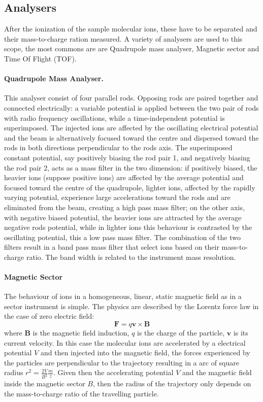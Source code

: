 \subsection{Analysers}

After the ionization of the sample molecular ions, these have to be separated
and their mass-to-charge ration measured.
A variety of analysers are used to this scope, the most commons are are
Quadrupole mass analyser, Magnetic sector and Time Of Flight (TOF).

\paragraph{Quadrupole Mass Analyser.}
This analyser consist of four parallel rods. Opposing rods are paired together
and connected electrically: a variable potential is applied between
the two pair of rods with radio frequency oscillations, while a time-independent
potential is superimposed.
The injected ions are affected by the oscillating electrical potential and the
beam is alternatively focused toward the centre and dispersed toward the rods in
both directions perpendicular to the rods axis.
The superimposed constant potential, say positively biasing the rod pair 1, and
negatively biasing the rod pair 2, acts as a mass filter in the two dimension:
if positively biased, the heavier ions (suppose positive ions) are affected by
the average potential and focused toward the centre of the quadrupole, lighter
ions, affected by the rapidly varying potential, experience large accelerations
toward the rods and are eliminated from the beam, creating a high pass mass
filter;
on the other axis, with negative biased potential, the heavier ions are
attracted by the average negative rods potential, while in lighter ions this
behaviour is contrasted by the oscillating potential, this a low pass mass
filter.
The combination of the two filters result in a band pass mass filter that select
ions based on their mass-to-charge ratio. The band width is related to the
instrument mass resolution\cite{Miller1986}.


\paragraph{Magnetic Sector}
The behaviour of ions in a homogeneous, linear, static magnetic field
as in a sector instrument is simple. The physics are
described by the Lorentz force law in the case of zero electric field:
\begin{equation}
    \mathbf{F} = q \mathbf{v} \times \mathbf{B}
\end{equation}
where $\mathbf{B}$ is the magnetic field induction, $q$ is
the charge of the particle, $\mathbf{v}$ is its current velocity.
In this case the molecular ions are accelerated by a electrical potential $V$
and
then injected into the magnetic field, the forces experienced by the particles
are perpendicular to the trajectory resulting in a arc of square radius
$r^2=\frac{2V}{B^2}\frac mz$.
Given then the accelerating potential $V$ and the magnetic field inside the
magnetic sector $B$, then the radius of the trajectory only depends on the
mass-to-charge ratio of the travelling particle.


